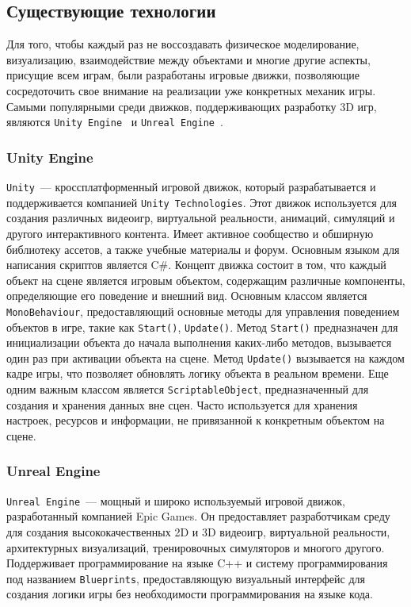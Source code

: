 \subsection{Существующие технологии}

Для того, чтобы каждый раз не воссоздавать физическое моделирование, визуализацию, взаимодействие между объектами и многие другие аспекты, присущие всем играм, были разработаны игровые движки, позволяющие сосредоточить свое внимание на реализации уже конкретных механик игры. Самыми популярными среди движков, поддерживающих разработку 3D игр, являются \texttt{Unity Engine}~\cite{enwiki:1186824491} и \texttt{Unreal Engine}~\cite{unrealengine}.

\subsubsection{Unity Engine}

\texttt{Unity}~--- кроссплатформенный игровой движок, который разрабатывается и поддерживается компанией \texttt{Unity Technologies}. Этот движок используется для создания различных видеоигр, виртуальной реальности, анимаций, симуляций и другого интерактивного контента. Имеет активное сообщество и обширную библиотеку ассетов, а также учебные материалы и форум. Основным языком для написания скриптов является C\#. Концепт движка состоит в том, что каждый объект на сцене является игровым объектом, содержащим различные компоненты, определяющие его поведение и внешний вид. Основным классом является \texttt{MonoBehaviour}, предоставляющий основные методы для управления поведением объектов в игре, такие как \texttt{Start()}, \texttt{Update()}. Метод \texttt{Start()} предназначен для инициализации объекта до начала выполнения каких-либо методов, вызывается один раз при активации объекта на сцене. Метод \texttt{Update()} вызывается на каждом кадре игры, что позволяет обновлять логику объекта в реальном времени. Еще одним важным классом является \texttt{ScriptableObject}, предназначенный для создания и хранения данных вне сцен. Часто используется для хранения настроек, ресурсов и информации, не привязанной к конкретным объектом на сцене.

\subsubsection{Unreal Engine}

\texttt{Unreal Engine}~--- мощный и широко используемый игровой движок, разработанный компанией Epic Games. Он предоставляет разработчикам среду для создания высококачественных 2D и 3D видеоигр, виртуальной реальности, архитектурных визуализаций, тренировочных симуляторов и многого другого. Поддерживает программирование на языке C++ и систему программирования под названием \texttt{Blueprints}, предоставляющую визуальный интерфейс для создания логики игры без необходимости программирования на языке кода.

